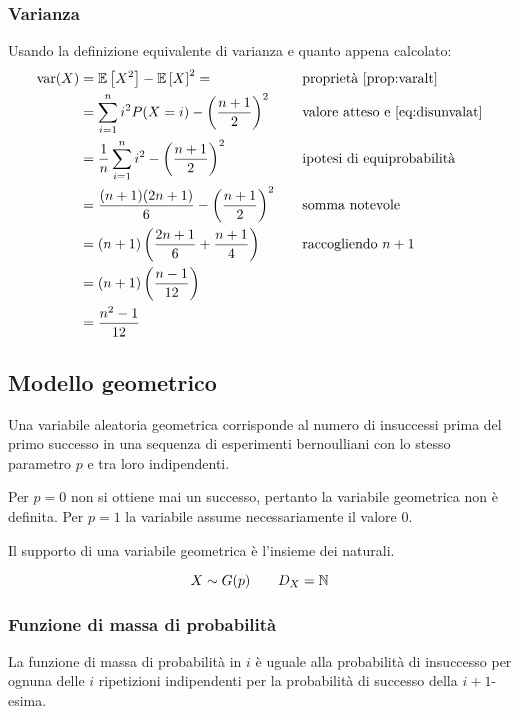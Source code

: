 \subsubsection{Varianza}
Usando la definizione equivalente di varianza e quanto appena calcolato:
\begin{align*}
	\operatorname{var}(X) & = \mathbb{E}\left[ X^2 \right] - \mathbb{E}\left[ X \right]^2 =                                       & \quad & \text{proprietà \ref{prop:varalt}}           \\
	        & = \sum_{i=1}^n i^2 P(X=i) - \left(\frac{n+1}{2}\right)^2      & \quad & \text{valore atteso e \eqref{eq:disunvalat}} \\
	        & = \frac{1}{n} \sum_{i=1}^n i^2 - \left(\frac{n+1}{2}\right)^2 & \quad & \text{ipotesi di equiprobabilità}            \\
	        & = \frac{(n+1)(2n+1)}{6}-\left(\frac{n+1}{2}\right)^2          & \quad & \text{somma notevole}                        \\
	        & = (n+1)\left(\frac{2n+1}{6}+\frac{n+1}{4}\right)              & \quad & \text{raccogliendo $n+1$}                    \\
	        & = (n+1)\left(\frac{n-1}{12}\right)                                                                       \\
	        & = \frac{n^2-1}{12}
\end{align*}



\subsection{Modello geometrico}
Una variabile aleatoria geometrica corrisponde al numero di insuccessi prima del primo successo in una sequenza di esperimenti bernoulliani con lo stesso parametro $p$ e tra loro indipendenti.

Per $p=0$ non si ottiene mai un successo, pertanto la variabile geometrica non è definita. Per $p=1$ la variabile assume necessariamente il valore $0$.

Il supporto di una variabile geometrica è l'insieme dei naturali.

\begin{equation*}
	X\sim G(p)\qquad D_X=\mathbb N
\end{equation*}


\subsubsection{Funzione di massa di probabilità}
La funzione di massa di probabilità in $i$ è uguale alla probabilità di insuccesso per ognuna delle $i$ ripetizioni indipendenti per la probabilità di successo della $i+1$-esima.

